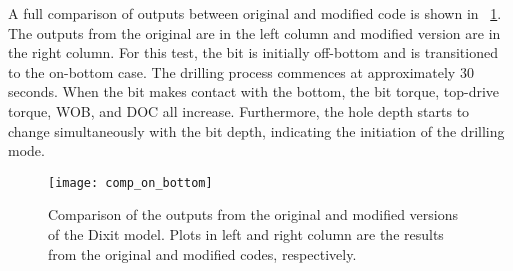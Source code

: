 A full comparison of outputs between original and modified code is shown in \figurename~\ref{Comaprison_on_bottom}.  The outputs from the original are in the left column and modified version are in the right column. For this test, the bit is initially off-bottom and is transitioned to the on-bottom case.  The drilling process commences at approximately 30 seconds. When the bit makes contact with the bottom, the bit torque, top-drive torque, WOB, and DOC all increase. Furthermore, the hole depth starts to change simultaneously with the bit depth, indicating the initiation of the drilling mode.
\begin{figure}
	\centering
	\texttt{[image: comp\_on\_bottom]}
    \caption[Output comparison of the original and modified model Dixit model]{Comparison of the outputs from the original and modified versions of the Dixit model. Plots in left and right column are the results from the original and modified codes, respectively.}
	\label{Comaprison_on_bottom}
\end{figure} 